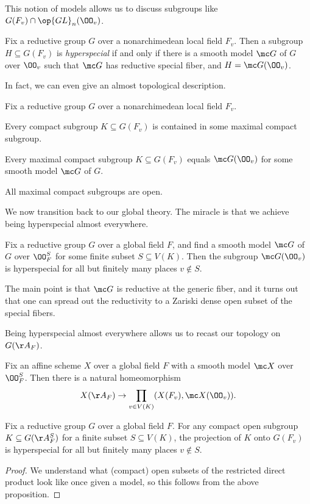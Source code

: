 \documentclass{article}
\begin{document}
This notion of models allows us to discuss subgroups like $G(F_v)\cap\op{GL}_n(\OO_v)$.
\begin{definition}[hyperspecial]
	Fix a reductive group $G$ over a nonarchimedean local field $F_v$. Then a subgroup $H\subseteq G(F_v)$ is \textit{hyperspecial} if and only if there is a smooth model $\mc G$ of $G$ over $\OO_v$ such that $\mc G$ has reductive special fiber, and $H=\mc G(\OO_v)$.
\end{definition}
In fact, we can even give an almost topological description.
\begin{theorem}
	Fix a reductive group $G$ over a nonarchimedean local field $F_v$.
	\begin{listalph}
		\item Every compact subgroup $K\subseteq G(F_v)$ is contained in some maximal compact subgroup.
		\item Every maximal compact subgroup $K\subseteq G(F_v)$ equals $\mc G(\OO_v)$ for some smooth model $\mc G$ of $G$.
		\item All maximal compact subgroups are open.
	\end{listalph}
\end{theorem}
We now transition back to our global theory. The miracle is that we achieve being hyperspecial almost everywhere.
\begin{theorem}
	Fix a reductive group $G$ over a global field $F$, and find a smooth model $\mc G$ of $G$ over $\OO_F^S$ for some finite subset $S\subseteq V(K)$. Then the subgroup $\mc G(\OO_v)$ is hyperspecial for all but finitely many places $v\notin S$.
\end{theorem}
The main point is that $\mc G$ is reductive at the generic fiber, and it turns out that one can spread out the reductivity to a Zariski dense open subset of the special fibers.

Being hyperspecial almost everywhere allows us to recast our topology on $G(\AA_F)$.
\begin{proposition}
	Fix an affine scheme $X$ over a global field $F$ with a smooth model $\mc X$ over $\OO_F^S$. Then there is a natural homeomorphism
	\[X(\AA_F)\to\prod_{v\in V(K)}(X(F_v),\mc X(\OO_v)).\]
\end{proposition}
\begin{corollary}
	Fix a reductive group $G$ over a global field $F$. For any compact open subgroup $K\subseteq G(\AA_F^S)$ for a finite subset $S\subseteq V(K)$, the projection of $K$ onto $G(F_v)$ is hyperspecial for all but finitely many places $v\notin S$.
\end{corollary}
\begin{proof}
	We understand what (compact) open subsets of the restricted direct product look like once given a model, so this follows from the above proposition.
\end{proof}
\end{document}
